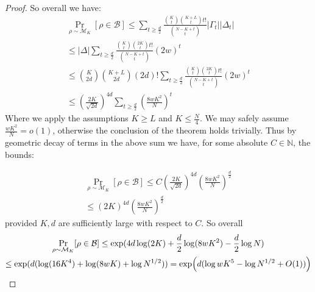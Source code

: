 \begin{proof}
So overall we have:
\begin{gather*}
\Pr_{\rho \sim \mathcal{M}_{K}}[\rho \in \mathcal{B}] \leq \sum\limits_{t \geq \frac{d}{2}}
\frac{\binom{K}{t}\binom{K+L}{t}t!}{\binom{N-K+t}{t}} |\Gamma_t| |\Delta_t|\\
\leq |\Delta|\sum\limits_{t \geq \frac{d}{2}}
\frac{\binom{K}{t}\binom{2K}{t}t!}{\binom{N-K+t}{t}} (2w)^t \\
\leq 
\binom{K}{2d}\binom{K+L}{2d}(2d)!\sum\limits_{t \geq \frac{d}{2}}
\frac{\binom{K}{t}\binom{2K}{t}t!}{\binom{N-K+t}{t}} (2w)^t \\
\leq (\frac{2K}{\sqrt{2d}})^{4d}\sum\limits_{t \geq \frac{d}{2}} \left(\frac{8wK^2}{N}\right)^t
\end{gather*}
Where we apply the assumptions $K \geq L$ and $K\leq \frac{N}{4}$. We may safely assume $\frac{wK^2}{N} = o(1)$, otherwise the conclusion of the theorem holds trivially. Thus by geometric decay of terms in the above sum we have, for some absolute $C \in \mathbb{N}$, the bounds:

\begin{gather*}
\Pr_{\rho \sim \mathcal{M}_{K}}[\rho \in \mathcal{B}] \leq C (\frac{2K}{\sqrt{2d}})^{4d}\left(\frac{8wK^2}{N}\right)^{\frac{d}{2}} \\
\leq (2K)^{4d} \left(\frac{8wK^2}{N}\right)^{\frac{d}{2}}
\end{gather*}
provided $K, d$ are sufficiently large with respect to $C$. So overall
\begin{gather*}
\Pr_{\rho \sim \mathcal{M}_{K}}[\rho \in \mathcal{B}] \leq \exp(4d \log(2K) + \frac{d}{2}\log(8wK^2) - \frac{d}{2} \log N) \\
\leq \exp(d(\log (16K^4) + \log (8wK) + \log N^{1/2}))
= \exp\Bigl(d (\log wK^5 -\log N^{1/2} + O(1))\Bigr)
\end{gather*}



\end{proof}


